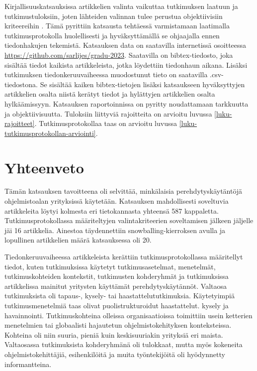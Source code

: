 \documentclass[utf8]{gradu3}
\begin{document}
Kirjallisuuskatsauksissa artikkelien valinta vaikuttaa tutkimuksen laatuun ja tutkimustuloksiin, joten lähteiden valinnan tulee perustua objektiivisiin kriteereihin \parencite{kitchenham-charters-2007}. Tämä pyrittiin katsausta tehtäessä varmistamaan laatimalla tutkimusprotokolla huolellisesti ja hyväksyttämällä se ohjaajalla ennen tiedonhakujen tekemistä. Katsauksen data on saatavilla internetissä osoitteessa 
 \href{https://github.com/sarlijes/gradu-2023}{https://github.com/sarlijes/gradu-2023}. Saatavilla on bibtex-tiedosto, joka sisältää tiedot kaikista artikkeleista, jotka löydettiin tiedonhaun aikana. Lisäksi tutkimuksen tiedonkeruuvaiheessa muodostunut tieto on saatavilla .csv-tiedostona. Se sisältää kaiken bibtex-tietojen lisäksi katsaukseen hyväksyttyjen artikkelien osalta niistä kerätyt tiedot ja hylättyjen artikkelien osalta hylkäämissyyn. Katsauksen raportoinnissa on pyritty noudattamaan tarkkuutta ja objektiivisuutta. Tuloksiin liittyviä rajoitteita on arvioitu luvussa \ref{luku-rajoitteet}. Tutkimusprotokollaa taas on arvioitu luvussa \ref{luku-tutkimusprotokollan-arviointi}.

\chapter{Yhteenveto}
\label{paaluku-yhteenveto}

Tämän katsauksen tavoitteena oli selvittää, minkälaisia perehdytyskäytäntöjä ohjelmistoalan yrityksissä käytetään. Katsauksen mahdollisesti soveltuvia artikkeleita löytyi kolmesta eri tietokannasta yhteensä 587 kappaletta. Tutkimusprotokollassa määriteltyjen valintakriteerien soveltamisen jälkeen jäljelle jäi 16 artikkelia. Ainestoa täydennettiin snowballing-kierroksen avulla ja lopullinen artikkelien määrä katsauksessa oli 20.

Tiedonkeruuvaiheessa artikkeleista kerättiin tutkimusprotokollassa määritellyt tiedot, kuten tutkimuksissa käytetyt tutkimusasetelmat, menetelmät, tutkimuskohteiden kontekstit, tutkimusten kohderyhmät ja tutkimuksissa artikkelissa mainitut yritysten käyttämät perehdytyskäytännöt. Valtaosa tutkimuksista oli tapaus-, kysely- tai haastattelututkimuksia. Käytetyimpiä tutkimusmenetelmiä taas olivat puolistrukturoidut haastattelut. kysely ja havainnointi. Tutkimuskohteina olleissa organisaatioissa toimittiin usein ketterien menetelmien tai globaalisti hajautetun ohjelmistokehityksen  konteksteissa. Kohteina oli niin suuria, pieniä kuin keskisuuriakin yrityksiä eri maista. Valtaosassa tutkimuksista kohderyhmänä oli tulokkaat, mutta myös kokeneita ohjelmistokehittäjiä, esihenkilöitä ja muita työntekijöitä oli hyödynnetty informantteina.
\end{document}
